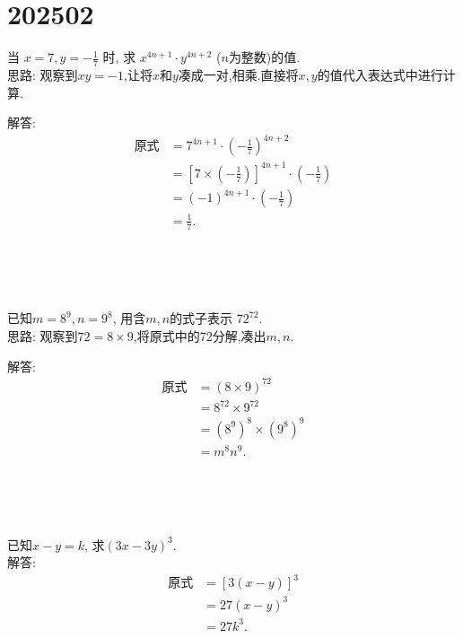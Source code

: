 \section{202502}

\item{
    当 $ x=7, y=-\frac{1}{7}$ 时, 求 $x^{4n+1}\cdot y^{4n+2}$ ($n$为整数)的值.
    \ifshowSolution
    \fangsong{}
    \\
    思路: 观察到$xy=-1$,让将$x$和$y$凑成一对,相乘.直接将$x, y$的值代入表达式中进行计算.

    解答: 
    \begin{align*}
        \mbox{原式} &= 7^{4n+1}\cdot \left(-\frac{1}{7}\right) ^{4n+2}\\
        &= [7\times(-\frac{1}{7})]^{4n+1} \cdot(-\frac{1}{7})\\
        &= (-1)^{4n+1} \cdot(-\frac{1}{7})\\
        &= \frac{1}{7}.
    \end{align*}
    \fi
} 
\\ \\ \\

\item{
    已知$ m=8^9, n=9^8 $, 用含$m, n$的式子表示 $72^{72}$.
    \ifshowSolution
    \fangsong{}
    \\
    思路: 观察到$72=8\times 9$,将原式中的72分解,凑出$m, n$.
    
    解答: 
    \begin{align*}
        \mbox{原式} &= (8\times 9)^{72}\\
        &= 8^{72}\times 9^{72}\\
        &= (8^9)^8\times (9^8)^9\\
        &= m^8 n^9.
    \end{align*}
    \fi
} 
\\ \\ \\

\item{
    已知$x-y=k$, 求$(3x-3y)^3.$
    \ifshowSolution
    \fangsong{}
    \\
    解答: 
    \begin{align*}
        \mbox{原式} &= [3(x-y)]^3\\
        &= 27(x-y)^3\\
        &= 27k^3.
    \end{align*}
    \fi
} 
\\ \\ \\

